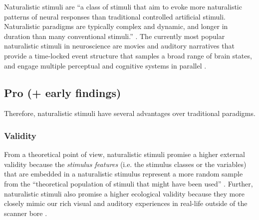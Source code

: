 Naturalistic stimuli are ``a class of stimuli that aim to evoke more
naturalistic patterns of neural responses than traditional controlled artificial
stimuli. Naturalistic paradigms are typically complex and dynamic, and longer in
duration than many conventional stimuli.'' \citep{vanderwal2019movies}.
The currently most popular naturalistic stimuli in neuroscience are movies and
auditory narratives \citep[cf.][for reviews]{jaaskelainen2021movies,
jaaskelainen2020neural} that provide a time-locked event structure that samples
a broad range of brain states, and engage multiple perceptual and cognitive
systems in parallel \citep{haxby2020naturalistic}.


\subsection{Pro (+ early findings)}
%
Therefore, naturalistic stimuli have several advantages over traditional
paradigms.



\subsubsection{Validity}

From a theoretical point of view, naturalistic stimuli promise a higher external
validity because the \textit{stimulus features} (i.e. the stimulus classes or
the variables) that are embedded in a naturalistic stimulus represent a more
random sample from the ``theoretical population of stimuli that might have been
used'' \citep{westfall2016fixing}.
Further, naturalistic stimuli also promise a higher ecological validity
\citep{zaki2009need, hasson2012future, hamilton2018revolution} because they more
closely mimic our rich visual and auditory experiences in real-life outside of
the scanner bore \citep{hasson2008neurocinematics, haxby2020naturalistic}.


